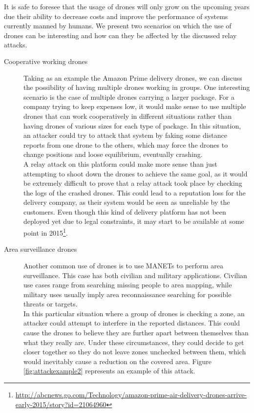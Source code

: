 \documentclass{article}
\begin{document}
It is safe to foresee that the usage of drones will only grow on the upcoming years due their ability to decrease costs and improve the performance of systems currently manned by humans. We present two scenarios on which the use of drones can be interesting and how can they be affected by the discussed relay attacks.\\

\begin{description}
  \item[Cooperative working drones] Taking as an example the Amazon Prime delivery drones, we can discuss the possibility of having multiple drones working in groups. One interesting scenario is the case of multiple drones carrying a larger package. For a company trying to keep expenses low, it would make sense to use multiple drones that can work cooperatively in different situations rather than having drones of various sizes for each type of package. In this situation, an attacker could try to attack that system by faking some distance reports from one drone to the others, which may force the drones to change positions and loose equilibrium, eventually crashing.\\
 
  A relay attack on this platform could make more sense than just attempting to shoot down the drones to achieve the same goal, as it would be extremely difficult to prove that a relay attack took place by checking the logs of the crashed drones. This could lead to a reputation loss for the delivery company, as their system would be seen as unreliable by the customers. Even though this kind of delivery platform has not been deployed yet due to legal constraints, it may start to be available at some point in 2015\footnote{\url{http://abcnews.go.com/Technology/amazon-prime-air-delivery-drones-arrive-early-2015/story?id=21064960}}.\\
  
  
  \item[Area surveillance drones] Another common use of drones is to use MANETs to perform area surveillance. This case has both civilian and military applications. Civilian use cases range from searching missing people to area mapping, while military uses usually imply area reconnaissance searching for possible threats or targets.\\
  
  In this particular situation where a group of drones is checking a zone, an attacker could attempt to interfere in the reported distances. This could cause the drones to believe they are further apart between themselves than what they really are. Under these circumstances, they could decide to get closer together so they do not leave zones unchecked between them, which would inevitably cause a reduction on the covered area. Figure \ref{fig:attackexample2} represents an example of this attack.\\
  

\end{description}
\end{document}
